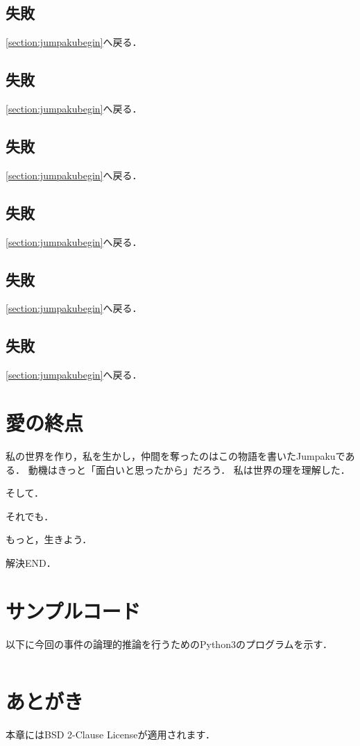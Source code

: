 \subsection{失敗}\label{subsection:jumpakulast3failureU}\ref{section:jumpakubegin}へ戻る．\newpage
\subsection{失敗}\label{subsection:jumpakulast3failureV}\ref{section:jumpakubegin}へ戻る．\newpage
\subsection{失敗}\label{subsection:jumpakulast3failureW}\ref{section:jumpakubegin}へ戻る．\newpage
\subsection{失敗}\label{subsection:jumpakulast3failureX}\ref{section:jumpakubegin}へ戻る．\newpage
\subsection{失敗}\label{subsection:jumpakulast3failureY}\ref{section:jumpakubegin}へ戻る．\newpage
\subsection{失敗}\label{subsection:jumpakulast3failureZ}\ref{section:jumpakubegin}へ戻る．\newpage

\section{愛の終点}\label{section:jumpakuending}
私の世界を作り，私を生かし，仲間を奪ったのはこの物語を書いたJumpakuである．
動機はきっと「面白いと思ったから」だろう．
私は世界の理を理解した．

そして．

それでも．

もっと，生きよう．

解決END．
\newpage

\section*{サンプルコード}\label{section:jumpakuprogram}
以下に今回の事件の論理的推論を行うためのPython3のプログラムを示す．
\inputminted[linenos]{python3}{\jumpakuasset/LogicQuiz.py}

\section*{あとがき}
本章にはBSD 2-Clause Licenseが適用されます．

